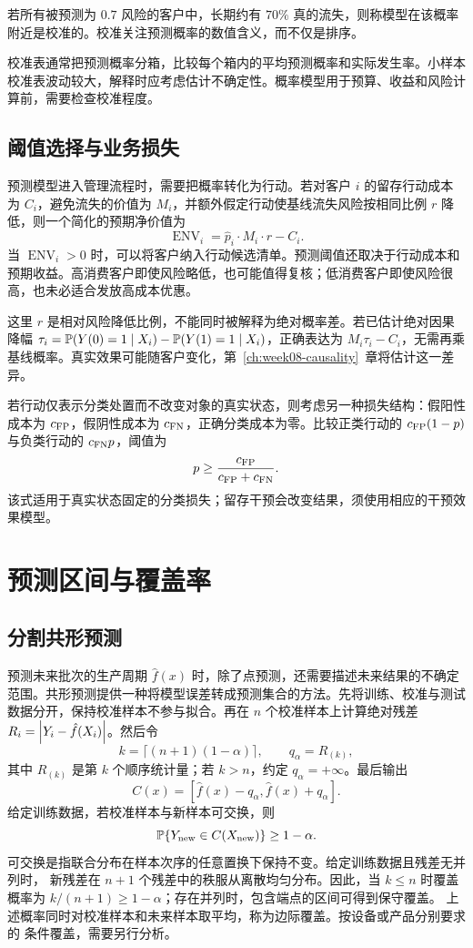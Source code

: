 \begin{definition}[概率校准]
若所有被预测为 \(0.7\) 风险的客户中，长期约有 \(70\%\) 真的流失，则称模型在该概率附近是校准的。校准关注预测概率的数值含义，而不仅是排序。
\end{definition}

校准表通常把预测概率分箱，比较每个箱内的平均预测概率和实际发生率。小样本校准表波动较大，解释时应考虑估计不确定性。概率模型用于预算、收益和风险计算前，需要检查校准程度。

\subsection{阈值选择与业务损失}

预测模型进入管理流程时，需要把概率转化为行动。若对客户 \(i\) 的留存行动成本为 \(C_i\)，避免流失的价值为 \(M_i\)，并额外假定行动使基线流失风险按相同比例 \(r\) 降低，则一个简化的预期净价值为
\[
  \operatorname{ENV}_i
  =
  \hat p_i \cdot M_i \cdot r - C_i.
\]
当 \(\operatorname{ENV}_i>0\) 时，可以将客户纳入行动候选清单。预测阈值还取决于行动成本和预期收益。高消费客户即使风险略低，也可能值得复核；低消费客户即使风险很高，也未必适合发放高成本优惠。

这里 \(r\) 是相对风险降低比例，不能同时被解释为绝对概率差。若已估计绝对因果降幅 \(\tau_i=\mathbb P(Y(0)=1\mid X_i)-\mathbb P(Y(1)=1\mid X_i)\)，正确表达为 \(M_i\tau_i-C_i\)，无需再乘基线概率。真实效果可能随客户变化，第~\ref{ch:week08-causality}~章将估计这一差异。

若行动仅表示分类处置而不改变对象的真实状态，则考虑另一种损失结构：假阳性成本为 \(c_{\rm FP}\)，假阴性成本为 \(c_{\rm FN}\)，正确分类成本为零。比较正类行动的 \(c_{\rm FP}(1-p)\) 与负类行动的 \(c_{\rm FN}p\)，阈值为
\[
p\ge\frac{c_{\rm FP}}{c_{\rm FP}+c_{\rm FN}}.
\]
该式适用于真实状态固定的分类损失；留存干预会改变结果，须使用相应的干预效果模型。

\section{预测区间与覆盖率}

\subsection{分割共形预测}
预测未来批次的生产周期 \(\hat f(x)\) 时，除了点预测，还需要描述未来结果的不确定范围。共形预测提供一种将模型误差转成预测集合的方法\cite{conformal07}。先将训练、校准与测试数据分开，保持校准样本不参与拟合。再在 \(n\) 个校准样本上计算绝对残差 \(R_i=\left\lvert Y_i-\hat f(X_i)\right\rvert\)。然后令
\[
k=\lceil(n+1)(1-\alpha)\rceil,\qquad
q_\alpha=R_{(k)},
\]
其中 \(R_{(k)}\) 是第 \(k\) 个顺序统计量；若 \(k>n\)，约定 \(q_\alpha=+\infty\)。最后输出
\[
C(x)=[\hat f(x)-q_\alpha,\hat f(x)+q_\alpha].
\]
给定训练数据，若校准样本与新样本可交换，则
\[
\mathbb P\{Y_{\rm new}\in C(X_{\rm new})\}\ge1-\alpha.
\]
可交换是指联合分布在样本次序的任意置换下保持不变。给定训练数据且残差无并列时，
新残差在 \(n+1\) 个残差中的秩服从离散均匀分布。因此，当 \(k\le n\) 时覆盖概率为
\(k/(n+1)\ge1-\alpha\)；存在并列时，包含端点的区间可得到保守覆盖。
上述概率同时对校准样本和未来样本取平均，称为边际覆盖。按设备或产品分别要求的
条件覆盖，需要另行分析。

